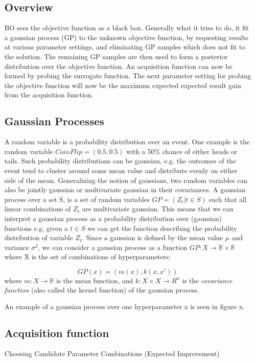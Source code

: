 \subsection{Overview}
BO sees the objective function as a black box. Generally what it tries to do, it fit a gaussian process (GP) to the unknown objective function, by requesting results at various parameter settings, and eliminating GP samples which does not fit to the solution. The remaining GP samples are then used to form a posterior distribution over the objective function. An acquisition function can now be formed by probing the surrogate function. The next parameter setting for probing the objective function will now be the maximum expected expected result gain from the acquisition function.

\subsection{Gaussian Processes}
A random variable is a probability distribution over an event. One example is the random variable $CoinFlip = (0.5, 0.5)$ with a 50\% chance of either heads or tails. Such probability distributions can be gaussian, e.g. the outcomes of the event tend to cluster around some mean value and distribute evenly on either side of the mean. Generalizing the notion of gaussians, two random variables can also be jointly gaussian or multivariate gaussian in their covariances. A gaussian process over a set S, is a set of random variables $GP = (Z_t | t \in S)$ such that all linear combinations of $Z_t$ are multivariate gaussian. This means that we can interpret a gaussian process as a probability distribution over (gaussian) functions e.g. given a $t \in S$ we can get the function describing the probability distribution of variable $Z_t$. Since a gaussian is defined by the mean value $\mu$ and variance $\sigma^2$, we can consider a gaussian process as a function $GP : X \rightarrow \mathbb{R} \times \mathbb{R}$ where X is the set of combinations of hyperparameters:

\begin{equation}\label{gaussian-process}
GP(x) = (m(x), k(x, x'))
\end{equation}
where $m : X \rightarrow \mathbb{R}$ is the mean function, and $k : X \times X \rightarrow R^n$ is the \emph{covariance function} (also called the kernel function) of the gaussian process.

An example of a gaussian process over one hyperparameter x is seen in figure x. 

\subsection{Acquisition function}

Choosing Candidate Parameter Combinations (Expected Improvement)

